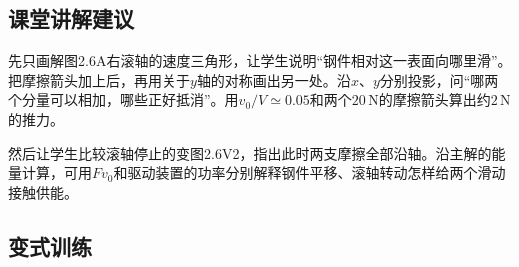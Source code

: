 \documentclass[UTF8,fontset=fandol,a4paper,11pt]{ctexart}
\begin{document}


\subsection*{课堂讲解建议}

先只画解图2.6A右滚轴的速度三角形，让学生说明“钢件相对这一表面向哪里滑”。把摩擦箭头加上后，再用关于$y$轴的对称画出另一处。沿$x$、$y$分别投影，问“哪两个分量可以相加，哪些正好抵消”。用$v_0/V\simeq0.05$和两个$20\,\mathrm N$的摩擦箭头算出约$2\,\mathrm N$的推力。

然后让学生比较滚轴停止的变图2.6V2，指出此时两支摩擦全部沿轴。沿主解的能量计算，可用$Fv_0$和驱动装置的功率分别解释钢件平移、滚轴转动怎样给两个滑动接触供能。



\subsection*{变式训练}
\end{document}
